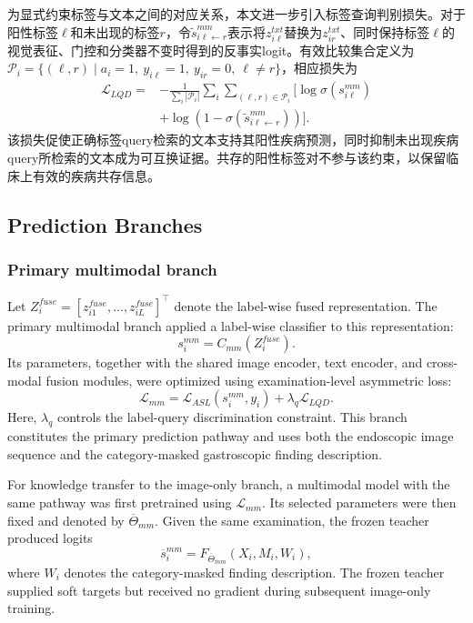 \documentclass[Afour,sagev,times]{sagej}
\begin{document}
为显式约束标签与文本之间的对应关系，本文进一步引入标签查询判别损失。对于阳性标签$\ell$和未出现的标签$r$，令$\widetilde{s}_{i\ell\leftarrow r}^{mm}$表示将$z_{i\ell}^{txt}$替换为$z_{ir}^{txt}$、同时保持标签$\ell$的视觉表征、门控和分类器不变时得到的反事实logit。有效比较集合定义为$\mathcal{P}_i=\{(\ell,r)\mid a_i=1,\ y_{i\ell}=1,\ y_{ir}=0,\ \ell\neq r\}$，相应损失为
\begin{equation}
\begin{aligned}
\mathcal{L}_{LQD}={}&-\frac{1}{\sum_i|\mathcal{P}_i|}
\sum_i\sum_{(\ell,r)\in\mathcal{P}_i}\Big[
\log\sigma(s_{i\ell}^{mm})\\
&+\log\left(1-\sigma(\widetilde{s}_{i\ell\leftarrow r}^{mm})\right)\Big].
\end{aligned}
\end{equation}
该损失促使正确标签query检索的文本支持其阳性疾病预测，同时抑制未出现疾病query所检索的文本成为可互换证据。共存的阳性标签对不参与该约束，以保留临床上有效的疾病共存信息。

\subsection{Prediction Branches}

\subsubsection{Primary multimodal branch}

Let $Z_i^{fuse}=[z_{i1}^{fuse},\ldots,z_{iL}^{fuse}]^{\top}$ denote the label-wise fused representation. The primary multimodal branch applied a label-wise classifier to this representation:
\begin{equation}
s_i^{mm}=C_{mm}(Z_i^{fuse}).
\end{equation}
Its parameters, together with the shared image encoder, text encoder, and cross-modal fusion modules, were optimized using examination-level asymmetric loss:
\begin{equation}
\mathcal{L}_{mm}=\mathcal{L}_{ASL}(s_i^{mm},y_i)+\lambda_q\mathcal{L}_{LQD}.
\end{equation}
Here, $\lambda_q$ controls the label-query discrimination constraint.
This branch constitutes the primary prediction pathway and uses both the endoscopic image sequence and the category-masked gastroscopic finding description.

For knowledge transfer to the image-only branch, a multimodal model with the same pathway was first pretrained using $\mathcal{L}_{mm}$. Its selected parameters were then fixed and denoted by $\overline{\Theta}_{mm}$. Given the same examination, the frozen teacher produced logits
\begin{equation}
\overline{s}_i^{mm}=F_{\overline{\Theta}_{mm}}(X_i,M_i,W_i),
\end{equation}
where $W_i$ denotes the category-masked finding description. The frozen teacher supplied soft targets but received no gradient during subsequent image-only training.
\end{document}
